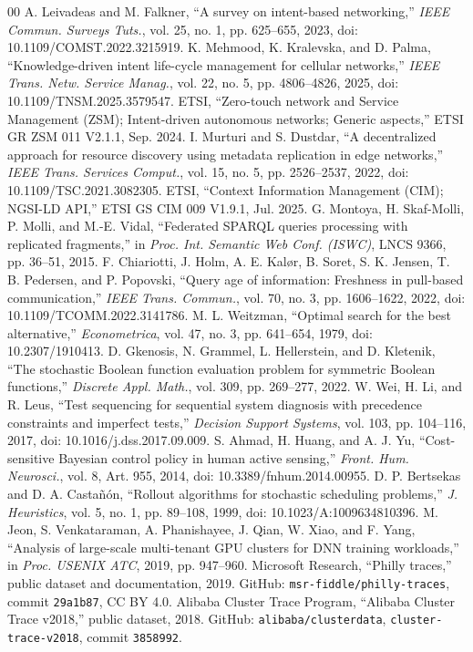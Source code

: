\documentclass[conference]{IEEEtran}
\begin{document}
\begin{thebibliography}{00}
 A. Leivadeas and M. Falkner, ``A survey on intent-based networking,'' \emph{IEEE Commun. Surveys Tuts.}, vol. 25, no. 1, pp. 625--655, 2023, doi: 10.1109/COMST.2022.3215919.
 K. Mehmood, K. Kralevska, and D. Palma, ``Knowledge-driven intent life-cycle management for cellular networks,'' \emph{IEEE Trans. Netw. Service Manag.}, vol. 22, no. 5, pp. 4806--4826, 2025, doi: 10.1109/TNSM.2025.3579547.
 ETSI, ``Zero-touch network and Service Management (ZSM); Intent-driven autonomous networks; Generic aspects,'' ETSI GR ZSM 011 V2.1.1, Sep. 2024.
 I. Murturi and S. Dustdar, ``A decentralized approach for resource discovery using metadata replication in edge networks,'' \emph{IEEE Trans. Services Comput.}, vol. 15, no. 5, pp. 2526--2537, 2022, doi: 10.1109/TSC.2021.3082305.
 ETSI, ``Context Information Management (CIM); NGSI-LD API,'' ETSI GS CIM 009 V1.9.1, Jul. 2025.
 G. Montoya, H. Skaf-Molli, P. Molli, and M.-E. Vidal, ``Federated SPARQL queries processing with replicated fragments,'' in \emph{Proc. Int. Semantic Web Conf. (ISWC)}, LNCS 9366, pp. 36--51, 2015.
 F. Chiariotti, J. Holm, A. E. Kal\o r, B. Soret, S. K. Jensen, T. B. Pedersen, and P. Popovski, ``Query age of information: Freshness in pull-based communication,'' \emph{IEEE Trans. Commun.}, vol. 70, no. 3, pp. 1606--1622, 2022, doi: 10.1109/TCOMM.2022.3141786.
 M. L. Weitzman, ``Optimal search for the best alternative,'' \emph{Econometrica}, vol. 47, no. 3, pp. 641--654, 1979, doi: 10.2307/1910413.
 D. Gkenosis, N. Grammel, L. Hellerstein, and D. Kletenik, ``The stochastic Boolean function evaluation problem for symmetric Boolean functions,'' \emph{Discrete Appl. Math.}, vol. 309, pp. 269--277, 2022.
 W. Wei, H. Li, and R. Leus, ``Test sequencing for sequential system diagnosis with precedence constraints and imperfect tests,'' \emph{Decision Support Systems}, vol. 103, pp. 104--116, 2017, doi: 10.1016/j.dss.2017.09.009.
 S. Ahmad, H. Huang, and A. J. Yu, ``Cost-sensitive Bayesian control policy in human active sensing,'' \emph{Front. Hum. Neurosci.}, vol. 8, Art. 955, 2014, doi: 10.3389/fnhum.2014.00955.
 D. P. Bertsekas and D. A. Casta\~n\'on, ``Rollout algorithms for stochastic scheduling problems,'' \emph{J. Heuristics}, vol. 5, no. 1, pp. 89--108, 1999, doi: 10.1023/A:1009634810396.
 M. Jeon, S. Venkataraman, A. Phanishayee, J. Qian, W. Xiao, and F. Yang, ``Analysis of large-scale multi-tenant GPU clusters for DNN training workloads,'' in \emph{Proc. USENIX ATC}, 2019, pp. 947--960.
 Microsoft Research, ``Philly traces,'' public dataset and documentation, 2019. GitHub: \texttt{msr-fiddle/philly-traces}, commit \texttt{29a1b87}, CC BY 4.0.
 Alibaba Cluster Trace Program, ``Alibaba Cluster Trace v2018,'' public dataset, 2018. GitHub: \texttt{alibaba/clusterdata}, \texttt{cluster-trace-v2018}, commit \texttt{3858992}.
\end{thebibliography}
\end{document}
